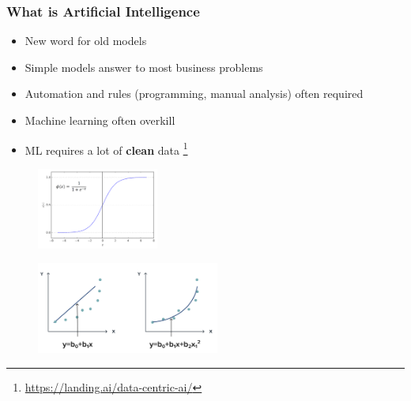 \begin{frame}\frametitle{What is Artificial Intelligence}
   \begin{itemize}
      \item New word for old models
      \item Simple models answer to most business problems
      \item Automation and rules (programming, manual analysis) often required
      \item Machine learning often overkill
      \item ML requires a lot of \textbf{clean} data
      \footnote{\href{https://landing.ai/data-centric-ai/}{https://landing.ai/data-centric-ai/}}
   \end{itemize}
   \vspace*{20px}
   \begin{minipage}{0.48\linewidth}
      \begin{figure}[H]
         \includegraphics[width=4cm]{../images/illustrations/logistic.png}
      \end{figure}
   \end{minipage}
   \begin{minipage}{0.48\linewidth}
      \begin{figure}[H]
         \includegraphics[width=6cm]{../images/illustrations/polynomial.png}
      \end{figure}
   \end{minipage}
\end{frame}

